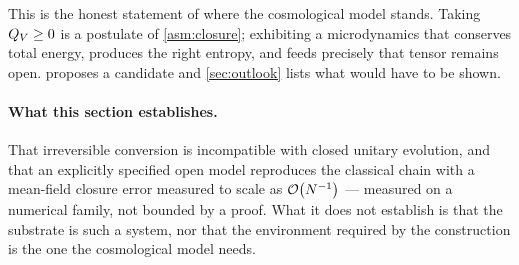 This is the honest statement of where the cosmological model stands. Taking
$Q_{V}\ge0$ is a postulate of \cref{asm:closure}; exhibiting a microdynamics that
conserves total energy, produces the right entropy, and feeds precisely that
tensor remains open.  proposes a candidate and
\cref{sec:outlook} lists what would have to be shown.

\paragraph{What this section establishes.}
That irreversible conversion is incompatible with closed unitary evolution, and
that an explicitly specified open model reproduces the classical chain with a
mean-field closure error measured to scale as $\mathcal{O}\!\left(N^{-1}\right)$ --- measured on
a numerical family, not bounded by a proof. What it does not establish is
that the substrate is such a system, nor that the environment required by the
construction is the one the cosmological model needs.

